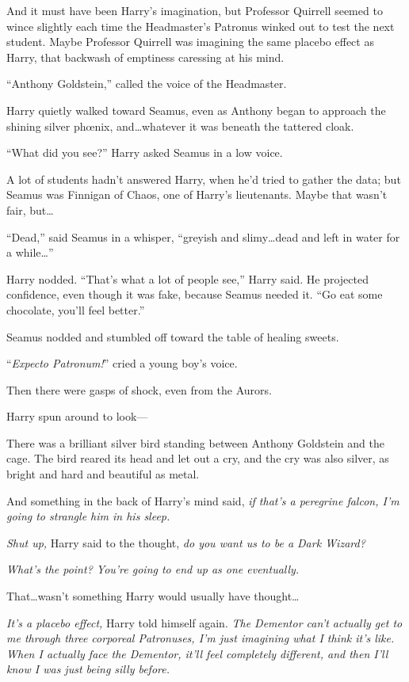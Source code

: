 And it must have been Harry’s imagination, but Professor Quirrell seemed to wince slightly each time the Headmaster’s Patronus winked out to test the next student. Maybe Professor Quirrell was imagining the same placebo effect as Harry, that backwash of emptiness caressing at his mind.

“Anthony Goldstein,” called the voice of the Headmaster.

Harry quietly walked toward Seamus, even as Anthony began to approach the shining silver phœnix, and…whatever it was beneath the tattered cloak.

“What did you see?” Harry asked Seamus in a low voice.

A lot of students hadn’t answered Harry, when he’d tried to gather the data; but Seamus was Finnigan of Chaos, one of Harry’s lieutenants. Maybe that wasn’t fair, but…

“Dead,” said Seamus in a whisper, “greyish and slimy…dead and left in water for a while…”

Harry nodded. “That’s what a lot of people see,” Harry said. He projected confidence, even though it was fake, because Seamus needed it. “Go eat some chocolate, you’ll feel better.”

Seamus nodded and stumbled off toward the table of healing sweets.

“\emph{Expecto Patronum!}” cried a young boy’s voice.

Then there were gasps of shock, even from the Aurors.

Harry spun around to look—

There was a brilliant silver bird standing between Anthony Goldstein and the cage. The bird reared its head and let out a cry, and the cry was also silver, as bright and hard and beautiful as metal.

And something in the back of Harry’s mind said, \emph{if that’s a peregrine falcon, I’m going to strangle him in his sleep.}

\emph{Shut up,} Harry said to the thought, \emph{do you want us to be a Dark Wizard?}

\emph{What’s the point? You’re going to end up as one eventually.}

That…wasn’t something Harry would usually have thought…

\emph{It’s a placebo effect,} Harry told himself again. \emph{The Dementor can’t actually get to me through three corporeal Patronuses, I’m just imagining what I think it’s like. When I actually face the Dementor, it’ll feel completely different, and then I’ll know I was just being silly before.}

